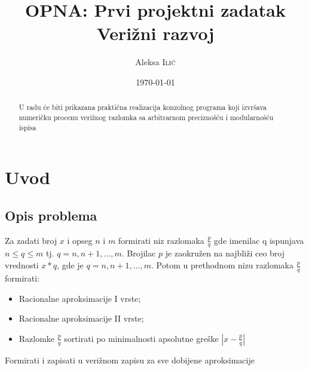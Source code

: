 \documentclass[a4paper,10pt]{article}
\title{OPNA: Prvi projektni zadatak \\ Verižni razvoj} %
\author{Aleksa \textsc{Ilić}} %
\date{\today} %
\begin{document}
\maketitle %

\begin{abstract}
    U radu će biti prikazana praktična realizacija konzolnog programa koji izvršava numeričku procenu verižnog razlomka sa arbitrarnom preciznošću i modularnošću ispisa
\end{abstract}


\section{Uvod}
\subsection{Opis problema}

Za zadati broj $\mathit{x}$ i opseg $\mathit{n}$ i $\mathit{m}$ formirati niz razlomaka $\frac{p}{q}$ gde imenilac q ispunjava 
$\mathit{n \leq q \leq m}$ tj. $\mathit{q = n, n+1, ..., m}$. Brojilac $\mathit{p}$ je zaokružen na najbliži ceo broj vrednosti $\mathit{x*q}$, gde je $\mathit{q = n, n+1, ..., m}$. Potom u prethodnom nizu razlomaka $\frac{p}{q}$ formirati:

\begin{itemize}
\item Racionalne aproksimacije I vrste;
\item Racionalne aproksimacije II vrste;
\item Razlomke $\frac{p}{q}$ sortirati po minimalnosti apsolutne greške $\left|\mathit{x-\frac{p}{q}}\right|$
\end{itemize}

Formirati i zapisati u verižnom zapisu za sve dobijene aproksimacije
\end{document}
